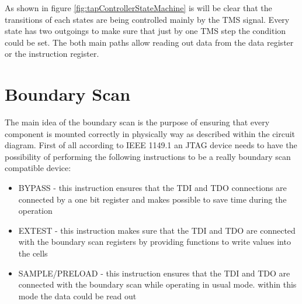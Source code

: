 As shown in figure \ref{fig:tapControllerStateMachine} is will be clear that the transitions of each states are being controlled mainly by the TMS signal. Every state has two outgoings to make sure that just by one TMS step the condition could be set. The both main paths allow reading out data from the data register or the instruction register.

	\section{Boundary Scan}
The main idea of the boundary scan is the purpose of ensuring that every component is mounted correctly in physically way as described within the circuit diagram.\cite{HarryBleeker.1993} First of all according to IEEE 1149.1 an \ac{JTAG} device needs to have the possibility of performing the following instructions to be a really boundary scan compatible device:\cite{XJTAG.13.03.2020}

\begin{itemize}
	\item BYPASS - this instruction ensures that the TDI and TDO connections are connected by a one bit register and makes possible to save time during the operation
	\item EXTEST - this instruction makes sure that the TDI and TDO are connected with the boundary scan registers by providing functions to write values into the cells
	\item SAMPLE/PRELOAD - this instruction ensures that the TDI and TDO are connected with the boundary scan while operating in usual mode. within this mode the data could be read out
\end{itemize}

